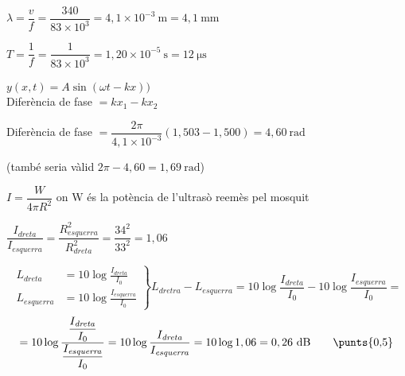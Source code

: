 \begin{solapartat}
 $\lambda = \dfrac{v}{f} = \dfrac{340}{83\times 10^{3}} = 4,1\times 10^{-3}\ \mathrm{m} = 4,1\ \mathrm{mm}$

 $T = \dfrac{1}{f} = \dfrac{1}{83\times 10^{3}} = 1,20\times 10^{-5}\ \mathrm{s} = 12\ \mathrm{\mu s}$

 $y(x, t) = A\sin(\omega t - kx))$\\
Diferència de fase $= kx_1 - kx_2$

 Diferència de fase $= \dfrac{2\pi}{4,1\times 10^{-3}}(1,503 - 1,500) = 4,60\ \mathrm{rad}$

(també seria vàlid $2\pi - 4,60 = 1,69\ \mathrm{rad}$)
\end{solapartat}

\begin{solapartat}
 $I = \dfrac{W}{4\pi R^2}$ on W és la potència de l'ultrasò reemès pel mosquit

 $\dfrac{I_\mathit{dreta}}{I_\mathit{esquerra}} = \dfrac{R^2_\mathit{esquerra}}{R^2_\mathit{dreta}} = \dfrac{34^2}{33^2} = 1,06$

\[ \left.\begin{aligned} L_\mathit{dreta} &= 10\log\frac{I_\mathit{dreta}}{I_0}\\ L_\mathit{esquerra} &= 10\log\frac{I_\mathit{esquerra}}{I_0}\end{aligned}\right\}
L_\mathit{dretra} - L_\mathit{esquerra} = 10\log\frac{I_\mathit{dreta}}{I_0} - 10\log\frac{I_\mathit{esquerra}}{I_0} = \]
\[ = 10\log\frac{\dfrac{I_\mathit{dreta}}{I_0}}{\dfrac{I_\mathit{esquerra}}{I_0}} = 10\log\frac{I_\mathit{dreta}}{I_\mathit{esquerra}} = 10\log 1,06 = 0,26\ \mathrm{dB} \qquad \text{\punts{0,5}} \]
\end{solapartat}
